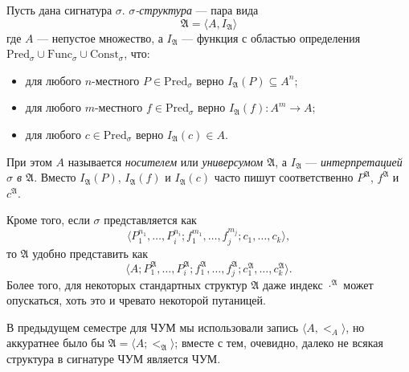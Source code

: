 \documentclass[12pt,a4paper]{article}
\newcommand{\Pred}{\ensuremath{\mathrm{Pred}}\xspace}
\newcommand{\Func}{\ensuremath{\mathrm{Func}}\xspace}
\newcommand{\Const}{\ensuremath{\mathrm{Const}}\xspace}
\begin{document}
    \begin{definition}
        Пусть дана сигнатура $\sigma$. \emph{$\sigma$-структура} --- пара вида
        \[\mathfrak{A} = \langle A, I_\mathfrak{A} \rangle\]
        где $A$ --- непустое множество, а $I_\mathfrak{A}$ --- функция с областью определения $\Pred_\sigma \cup \Func_\sigma \cup \Const_\sigma$, что:
        \begin{itemize}
            \item для любого $n$-местного $P \in \Pred_\sigma$ верно $I_\mathfrak{A}(P) \subseteq A^n$;
            \item для любого $m$-местного $f \in \Pred_\sigma$ верно $I_\mathfrak{A}(f): A^m \rightarrow A$;
            \item для любого $c \in \Pred_\sigma$ верно $I_\mathfrak{A}(c) \in A$.
        \end{itemize}

        При этом $A$ называется \emph{носителем} или \emph{универсумом $\mathfrak{A}$}, а $I_\mathfrak{A}$ --- \emph{интерпретацией $\sigma$ в $\mathfrak{A}$}. Вместо $I_\mathfrak{A}(P)$, $I_\mathfrak{A}(f)$ и $I_\mathfrak{A}(c)$ часто пишут соответственно $P^\mathfrak{A}$, $f^\mathfrak{A}$ и $c^\mathfrak{A}$.

        Кроме того, если $\sigma$ представляется как
        \[\langle P_1^{n_1}, \dots, P_i^{n_i}; f_1^{m_1}, \dots, f_j^{m_j}; c_1, \dots, c_k \rangle,\]
        то $\mathfrak{A}$ удобно представить как
        \[\langle A; P_1^\mathfrak{A}, \dots, P_i^\mathfrak{A}; f_1^\mathfrak{A}, \dots, f_j^\mathfrak{A}; c_1^\mathfrak{A}, \dots, c_k^\mathfrak{A} \rangle.\]
        Более того, для некоторых стандартных структур $\mathfrak{A}$ даже индекс $\cdot^\mathfrak{A}$ может опускаться, хоть это и чревато некоторой путаницей.
    \end{definition}

    \begin{remark*}
        В предыдущем семестре для ЧУМ мы использовали запись $\langle A, {<}_A \rangle$, но аккуратнее было бы $\mathfrak{A} = \langle A; {<}_\mathfrak{A} \rangle$; вместе с тем, очевидно, далеко не всякая структура в сигнатуре ЧУМ является ЧУМ.
    \end{remark*}
\end{document}
